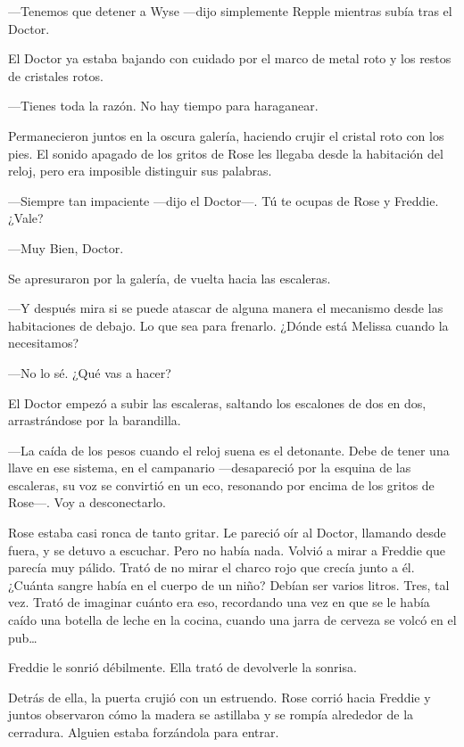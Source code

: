 {---Tenemos que detener a Wyse ---dijo simplemente Repple mientras subía
tras el Doctor.}

{El Doctor ya estaba bajando con cuidado por el marco de metal roto y
los restos de cristales rotos.}

{---Tienes toda la razón. No hay tiempo para haraganear.}

{Permanecieron juntos en la oscura galería, haciendo crujir el cristal
	roto con los pies. El sonido apagado de los gritos de Rose les llegaba
	desde la habitación del reloj, pero era imposible distinguir sus
palabras.}

{---Siempre tan impaciente ---dijo el Doctor---. Tú te ocupas de Rose y
Freddie. ¿Vale?}

{---Muy Bien, Doctor.}

{Se apresuraron por la galería, de vuelta hacia las escaleras.}

{---Y después mira si se puede atascar de alguna manera el mecanismo
	desde las habitaciones de debajo. Lo que sea para frenarlo. ¿Dónde está
Melissa cuando la necesitamos?}

{---No lo sé. ¿Qué vas a hacer?}

{El Doctor empezó a subir las escaleras, saltando los escalones de dos
en dos, arrastrándose por la barandilla.}

{---La caída de los pesos cuando el reloj suena es el detonante. Debe de
	tener una llave en ese sistema, en el campanario ---desapareció por la
	esquina de las escaleras, su voz se convirtió en un eco, resonando por
encima de los gritos de Rose---. Voy a desconectarlo.}

{}

{Rose estaba casi ronca de tanto gritar. Le pareció oír al Doctor,
	llamando desde fuera, y se detuvo a escuchar. Pero no había nada. Volvió
	a mirar a Freddie que parecía muy pálido. Trató de no mirar el charco
	rojo que crecía junto a él. ¿Cuánta sangre había en el cuerpo de un
	niño? Debían ser varios litros. Tres, tal vez. Trató de imaginar cuánto
	era eso, recordando una vez en que se le había caído una botella de
	leche en la cocina, cuando una jarra de cerveza se volcó en el
	pub\ldots{}}

{Freddie le sonrió débilmente. Ella trató de devolverle la sonrisa.}

{Detrás de ella, la puerta crujió con un estruendo. Rose corrió hacia
	Freddie y juntos observaron cómo la madera se astillaba y se rompía
alrededor de la cerradura. Alguien estaba forzándola para entrar.}

